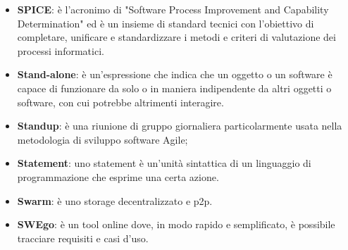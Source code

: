 \documentclass[a4paper, oneside, openany, dvipsnames, table]{article}
\begin{document}
\begin{itemize}
\item \textbf{SPICE}: è l'acronimo di "Software Process Improvement and Capability Determination" ed è un insieme di standard tecnici con l’obiettivo di completare, unificare e standardizzare i metodi e criteri di valutazione dei processi informatici.
\item \textbf{Stand-alone}: è un'espressione che indica che un oggetto o un software è capace di funzionare da solo o in maniera indipendente da altri oggetti o software, con cui potrebbe altrimenti interagire.
\item \textbf{Standup}: è una riunione di gruppo giornaliera particolarmente usata nella metodologia di sviluppo software Agile;
\item \textbf{Statement}: uno statement è un'unità sintattica di un linguaggio di programmazione che esprime una certa azione.
\item \textbf{Swarm}: è uno storage decentralizzato e p2p.
\item \textbf{SWEgo}: è un tool online dove, in modo rapido e semplificato, è possibile tracciare requisiti e casi d'uso.
\end{itemize}
\end{document}
